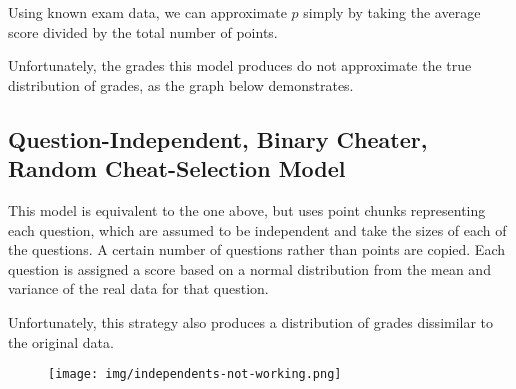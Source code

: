 \documentclass{article}
\begin{document}
        Using known exam data, we can approximate $p$ simply by taking the average score divided
            by the total number of points.

        Unfortunately, the grades this model produces do not approximate the true distribution
            of grades, as the graph below demonstrates.

    \subsection{Question-Independent, Binary Cheater, Random Cheat-Selection Model}
        This model is equivalent to the one above, but uses point chunks representing each
            question, which are assumed to be independent and take the sizes of each of the
            questions. A certain number of questions rather than points are copied. Each question
            is assigned a score based on a normal distribution from the mean and variance of
            the real data for that question.

        Unfortunately, this strategy also produces a distribution of grades dissimilar to the
            original data.

        \begin{figure}[h!]
            \centering
            \texttt{[image: img/independents-not-working.png]}
        \end{figure}
\end{document}
